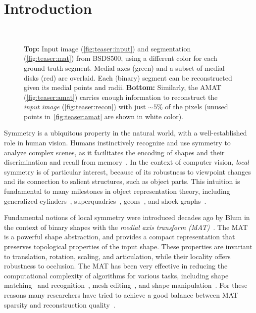 \documentclass[10pt,twocolumn,letterpaper]{article}
\begin{document}
\section{Introduction}\label{sec:introduction}
\begin{figure}[!t]
\centering
\def\imgw{0.49}
 \\
\caption{\textbf{Top:} Input image (\ref{fig:teaser:input}) and segmentation (\ref{fig:teaser:mat}) from BSDS500,
using a different color for each ground-truth segment. 
Medial axes (green) and a subset of medial disks (red) are overlaid. 
Each (binary) segment can be reconstructed given its medial points and radii. 
\textbf{Bottom:} Similarly, the AMAT (\ref{fig:teaser:amat}) carries enough information to reconstruct the 
 \emph{input image} (\ref{fig:teaser:recon}) with just $\sim 5\%$ of the pixels 
 (unused points in~\ref{fig:teaser:amat} are shown in white color).}
\label{fig:teaser}
\end{figure}

Symmetry is a ubiquitous property in the natural world, with a well-established role in human vision.
Humans instinctively recognize and use symmetry to analyze complex scenes, as it facilitates the encoding of shapes and
their discrimination and recall from memory~\cite{barlow1979versatility,royer1981detection,wagemans1998parallel}.
In the context of computer vision, \emph{local} symmetry is of particular interest, 
because of its robustness to viewpoint changes and its connection to salient structures, such as object parts.
This intuition is fundamental to many milestones in object representation theory, including generalized
cylinders~\cite{binford1971visual}, superquadrics~\cite{barr1981superquadrics}, 
geons~\cite{biederman1987recognition}, and shock graphs~\cite{siddiqi1999shock}.

Fundamental notions of local symmetry were introduced decades ago by Blum in the context 
of binary shapes with the \emph{medial axis transform (MAT)}~\cite{blum1967transformation,blum1973biological}.
The MAT is a powerful shape abstraction, and provides a compact representation that preserves topological
properties of the input shape. 
These properties are invariant to translation, rotation, scaling, and articulation, 
while their locality offers robustness to occlusion.
The MAT has been very effective in reducing the computational complexity of algorithms for various tasks,
including shape matching~\cite{siddiqi1999shock} and recognition~\cite{sebastian2001recognition},
mesh editing~\cite{li2001decomposing,yoshizawa2003free}, and shape manipulation~\cite{du2004medial}.
For these reasons many researchers have tried to achieve a good balance
between MAT sparsity and reconstruction quality~\cite{tam2003shape,li2015q}.
\end{document}
